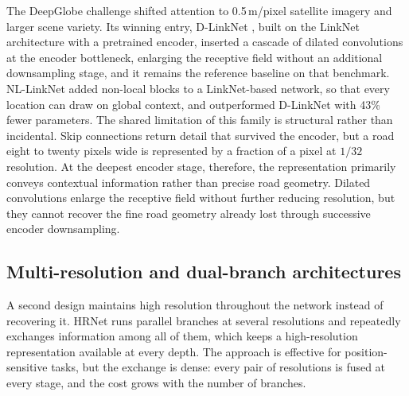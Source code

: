 \documentclass[a4paper,fleqn, review]{cas-sc}
\begin{document}
The DeepGlobe challenge \cite{demir2018deepglobe} shifted attention to
0.5\,m/pixel satellite imagery and larger scene variety. Its winning entry,
D-LinkNet \cite{zhou2018dlinknet}, built on the LinkNet architecture with a
pretrained encoder, inserted a cascade of dilated convolutions at
the encoder bottleneck, enlarging the receptive field without an additional
downsampling stage, and it remains the reference baseline on that benchmark.
NL-LinkNet \cite{wang2022nllinknet} added non-local blocks to a LinkNet-based
network, so that every location can draw on global context, and outperformed
D-LinkNet with 43\% fewer parameters. The
shared limitation of this family is structural rather than incidental. Skip
connections return detail that survived the encoder, but a road eight to twenty
pixels wide is represented by a fraction of a pixel at $1/32$ resolution. At the deepest encoder stage, therefore, the representation primarily conveys contextual information rather than precise road geometry. Dilated convolutions enlarge the receptive field without further reducing resolution, but they cannot recover the fine road geometry already lost through successive encoder downsampling.

\subsection{Multi-resolution and dual-branch architectures}
\label{subsec:rw-multires}

A second design maintains high resolution throughout the network instead of
recovering it. HRNet \cite{wang2021hrnet} runs parallel branches at several
resolutions and repeatedly exchanges information among all of them, which keeps a
high-resolution representation available at every depth. The approach is
effective for position-sensitive tasks, but the exchange is dense: every pair of
resolutions is fused at every stage, and the cost grows with the number of
branches.
\end{document}
